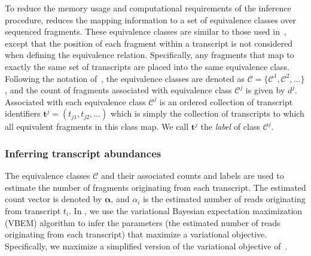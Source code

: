 To reduce the memory usage and computational requirements of the inference procedure, \quasiSF reduces the mapping information to a set of equivalence classes over sequenced fragments.  These equivalence classes are similar to those used in~\citet{isoem}, except that the position of each fragment within a transcript is not considered when defining the equivalence relation.  Specifically, any fragments that map to exactly the same set of transcripts are placed into the same equivalence class. Following the notation of~\citet{patro2015salmon}, the equivalence classes are denoted as $\bm{\mathcal{C}} = \{\mathcal{C}^{1}, \mathcal{C}^{2}, \dots \}$, and the count of fragments associated with equivalence class $\mathcal{C}^{j}$ is given by $d^j$.  Associated with each equivalence class $\mathcal{C}^{j}$ is an ordered collection of transcript identifiers $\mathbf{t}^{j} = \left(t_{j1}, t_{j2}, \dots\right)$ which is simply the collection of transcripts to which all equivalent fragments in this class map.  We call $\mathbf{t}^{j}$ the \textit{label} of class $\mathcal{C}^{j}$.

\subsubsection{Inferring transcript abundances}

The equivalence classes $\bm{\mathcal{C}}$ and their associated counts and labels are used to estimate the number of fragments originating from each transcript.  The estimated count vector is denoted by $\bm{\alpha}$, and $\alpha_i$ is the estimated number of reads originating from transcript $t_i$. In \quasiSF, we use the variational Bayesian expectation maximization (VBEM) algorithm to infer the parameters (the estimated number of reads originating from each transcript) that maximize a variational objective.  Specifically, we maximize a simplified version of the variational objective of~\citet{tigar}.

